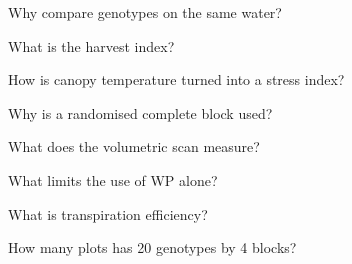 \begin{exlist}
\item Why compare genotypes on the same water?
\item What is the harvest index?
\item How is canopy temperature turned into a stress index?
\item Why is a randomised complete block used?
\item What does the volumetric scan measure?
\item What limits the use of WP alone?
\item What is transpiration efficiency?
\item How many plots has 20 genotypes by 4 blocks?
\end{exlist}
